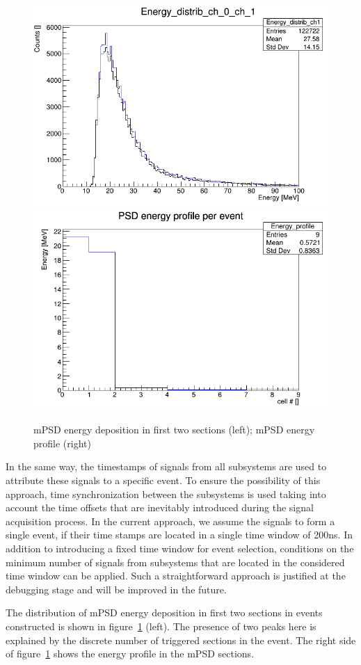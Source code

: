 \documentclass[a4paper,11pt]{article}
\begin{document}
\begin{figure}[htbp]
\centering %
\includegraphics[width=.4\textwidth]{en_distr_ch0_ch1.png}
\qquad
\includegraphics[width=.4\textwidth]{PsdEprofileInEvent_calibrd.png}
\caption{\label{fig:7} mPSD energy deposition in first two sections (left); mPSD energy profile (right)}
\end{figure}

In the same way, the timestamps of signals from all subsystems are used to attribute these signals to a specific event. To ensure the possibility of this approach, time synchronization between the subsystems is used taking into account the time offsets that are inevitably introduced during the signal acquisition process. In the current approach, we assume the signals to form a single event, if their time stamps are located in a single time window of 200ns. In addition to introducing a fixed time window for event selection, conditions on the minimum number of signals from subsystems that are located in the considered time window can be applied. Such a straightforward approach is justified at the debugging stage and will be improved in the future.

The distribution of mPSD energy deposition in first two sections in events constructed is shown in figure~\ref{fig:7} (left). The presence of two peaks here is explained by the discrete number of triggered sections in the event. The right side of figure~\ref{fig:7} shows the energy profile in the mPSD sections.
\end{document}
